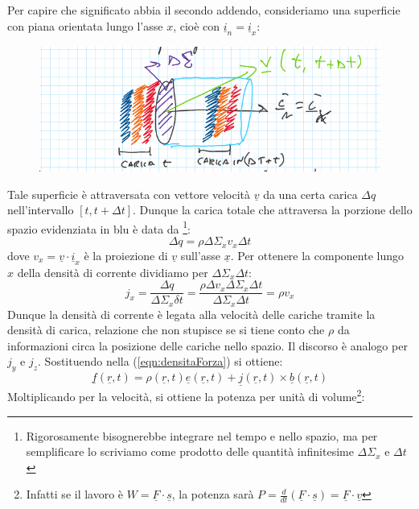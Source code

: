 \documentclass{book}
\begin{document}
        Per capire che significato abbia il secondo addendo, consideriamo una superficie con piana orientata lungo l'asse $x$, cioè con $\underline{i}_{n} = \underline{i}_{x}$:
        \begin{figure}[h!]
            \includegraphics[width=0.6\linewidth]{img/Chapter_one/Chapt1img9.png}
        \end{figure}
        Tale superficie è attraversata con vettore velocità $\underline{v}$ da una certa carica $\Delta q$ nell'intervallo $[t, t+\Delta t]$.
        Dunque la carica totale che attraversa la porzione dello spazio evidenziata in blu è data da
        \footnote{Rigorosamente bisognerebbe integrare nel tempo e nello spazio, ma per semplificare lo scriviamo come prodotto delle quantità infinitesime $\Delta \Sigma_{x}$ e $\Delta t$}:
        \begin{equation}
            \Delta q = \rho \Delta \Sigma_{x}v_{x}\Delta t
        \end{equation}
        dove $v_{x} = \underline{v} \cdot \underline{i}_{x}$ è la proiezione di $\underline{v}$ sull'asse $\underline{x}$. Per ottenere la componente lungo $x$ della densità di corrente dividiamo per $\Delta \Sigma_{x}\Delta t$:
        \begin{equation}
                j_{x}=\frac{\Delta q}{\Delta \Sigma_{x}\delta t} = \frac{\rho \Delta v_{x}\Delta \Sigma_{x}\Delta t}{\Delta \Sigma_{x}\Delta t}=\rho v_{x}
        \end{equation}
        Dunque la densità di corrente è legata alla velocità delle cariche tramite la densità di carica, relazione che non stupisce se si tiene conto che $\rho$ da informazioni circa la posizione delle cariche nello spazio.
        Il discorso è analogo per $j_{y}$ e $j_{z}$. Sostituendo nella (\ref{eqn:densitaForza}) si ottiene:
        \begin{equation}
            \underline{f}(\underline{r},t)=\rho(\underline{r},t)\underline{e}(\underline{r},t)+\underline{j}(\underline{r},t)\times \underline{b}(\underline{r},t)
        \end{equation}
        Moltiplicando per la velocità, si ottiene la potenza per unità di volume\footnote{Infatti se il lavoro è $W=\underline{F} \cdot \underline{s}$, la potenza sarà $P= \frac{d}{dt}(\underline{F}\cdot \underline{s})=\underline{F}\cdot \underline{v}$}:
\end{document}
